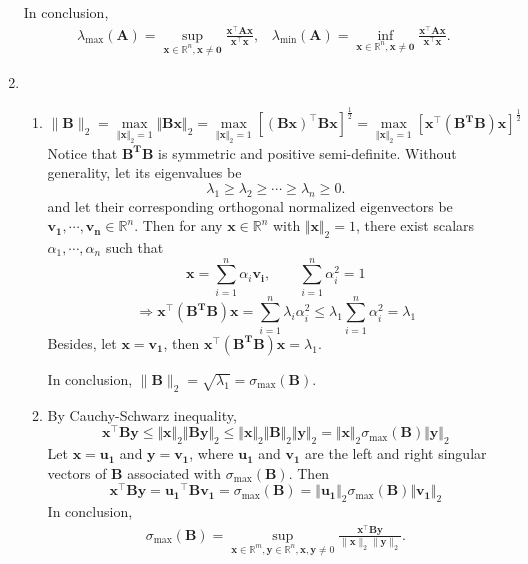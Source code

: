 \documentclass[11pt,letter,notitlepage]{article}
\theoremstyle{definition}
\begin{document}
\begin{solution}
\begin{enumerate}
		In conclusion,
		\begin{align*}
            \lambda_{\max}(\mathbf{A})=\sup_{\mathbf{x}\in\mathbb{R}^n, \mathbf{x}\not=\mathbf{0}} \frac{\mathbf{x}^\top\mathbf{A}\mathbf{x}}{\mathbf{x}^\top\mathbf{x}},\,\,\,\,\,
            \lambda_{\min}(\mathbf{A})=\inf_{\mathbf{x}\in\mathbb{R}^n, \mathbf{x}\not=\mathbf{0}} \frac{\mathbf{x}^\top\mathbf{A}\mathbf{x}}{\mathbf{x}^\top\mathbf{x}}.
        \end{align*}
		\item 
		\begin{enumerate}
			\item 
			\[
			\|\mathbf{B}\|_2
			=
			\max_{\Vert \mathbf{x} \Vert_2 = 1} \Vert \mathbf{Bx} \Vert_2
			=
			\max_{\Vert \mathbf{x} \Vert_2 = 1} [(\mathbf{Bx})^{\top} \mathbf{Bx}]^{\frac{1}{2}}
			=
			\max_{\Vert \mathbf{x} \Vert_2 = 1} [\mathbf{x}^{\top} (\mathbf{B^T B}) \mathbf{x}]^{\frac{1}{2}}
			\]
			Notice that $\mathbf{B^T B}$ is symmetric and positive semi-definite. Without generality, let its eigenvalues be
			\[
			\lambda_1 \geq \lambda_2 \geq \cdots \geq \lambda_n \geq 0.
			\]
			and let their corresponding orthogonal normalized eigenvectors be $\mathbf{v_1}, \cdots, \mathbf{v_n} \in \mathbb{R}^n$. Then for any $\mathbf{x} \in \mathbb{R}^n$ with $\Vert \mathbf{x} \Vert_2 = 1$, there exist scalars $\alpha_1, \cdots, \alpha_n$ such that
			\[
			\mathbf{x} = \sum\limits_{i=1}^{n} \alpha_i \mathbf{v_i},
			\qquad
			\sum\limits_{i=1}^{n} \alpha_i^2 = 1
			\]
			\[
			\Longrightarrow
			\mathbf{x}^{\top} (\mathbf{B^T B}) \mathbf{x}
			=
			\sum\limits_{i=1}^{n} \lambda_i \alpha_i^2
			\leq
			\lambda_1 \sum\limits_{i=1}^{n} \alpha_i^2
			=
			\lambda_1
			\]
			Besides, let $\mathbf{x} = \mathbf{v_1}$, then $\mathbf{x}^{\top} (\mathbf{B^T B}) \mathbf{x} = \lambda_1$. 
			
			In conclusion, $\|\mathbf{B}\|_2 = \sqrt{\lambda_1} = \sigma_{\max}(\mathbf{B})$.
			\item 
			By Cauchy-Schwarz inequality,
			\[
			\mathbf{x}^{\top} \mathbf{B} \mathbf{y}
			\leq
			\Vert \mathbf{x} \Vert_2 \Vert \mathbf{B} \mathbf{y} \Vert_2
			\leq
			\Vert \mathbf{x} \Vert_2 \Vert \mathbf{B} \Vert_2 \Vert \mathbf{y} \Vert_2
			=
			\Vert \mathbf{x} \Vert_2 \sigma_{\max}(\mathbf{B}) \Vert \mathbf{y} \Vert_2
			\]
			Let $\mathbf{x} = \mathbf{u_1}$ and $\mathbf{y} = \mathbf{v_1}$, where $\mathbf{u_1}$ and $\mathbf{v_1}$ are the left and right singular vectors of $\mathbf{B}$ associated with $\sigma_{\max}(\mathbf{B})$. Then
			\[
			\mathbf{x}^{\top} \mathbf{B} \mathbf{y}
			=
			\mathbf{u_1}^{\top} \mathbf{B} \mathbf{v_1}
			=
			\sigma_{\max}(\mathbf{B})
			=
			\Vert \mathbf{u_1} \Vert_2 \sigma_{\max}(\mathbf{B}) \Vert \mathbf{v_1} \Vert_2
			\]
			In conclusion,
			\begin{align*}
			\sigma_{\max}(\mathbf{B})=\sup_{\mathbf{x}\in\mathbb{R}^m, \mathbf{y}\in\mathbb{R}^n, \mathbf{x},\mathbf{y}\not=0}\frac{\mathbf{x}^\top \mathbf{B}\mathbf{y}}{\|\mathbf{x}\|_2\|\mathbf{y}\|_2}.
			\end{align*}
		\end{enumerate}	
	\end{enumerate}
\end{solution}
\end{document}
